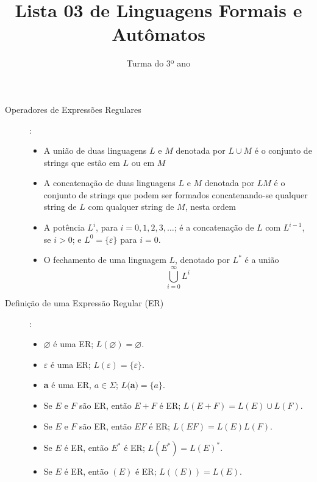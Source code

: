 \documentclass[12pt]{exam}
\title{Lista 03 de Linguagens Formais e Autômatos}
\date{}
\author{Turma do 3º ano}
\def\ve{\varepsilon}
\def\emptyset{\varnothing}
\begin{document}
 

\maketitle

\begin{description}

\item[Operadores de Expressões Regulares]:
\begin{itemize}
\item A união de duas linguagens $L$ e $M$ denotada por $L\cup M$ 
é o conjunto de strings que estão em $L$ ou em $M$
\item A concatenação de duas linguagens $L$ e $M$ denotada por $LM$
é o conjunto de strings que podem ser formados concatenando-se qualquer string de $L$ 
com qualquer string de $M$, 
nesta ordem
\item A potência $L^i$, para $i=0,1,2,3, \dots$; é a concatenação de $L$ com $L^{i-1}$, se $i>0$;
e $L^0 = \{\ve\}$ para $i=0$.
\item O fechamento de uma linguagem $L$, denotado por $L^*$ é a união
\[\bigcup_{i=0}^\infty L^i\]
\end{itemize}

\item[Definição de uma Expressão Regular (ER)]:

\begin{itemize}
\item $\emptyset$ é uma ER; $L(\emptyset) = \emptyset$.
\item $\ve$ é uma ER; $L(\ve) = \{\ve\}$.
\item \textbf{a} é uma ER, $a\in \Sigma$; $L($\textbf{a}$) = \{a\}$.
\item Se $E$ e $F$ são ER, então $E+F$ é ER; $L(E+F) = L(E)\cup L(F)$.
\item Se $E$ e $F$ são ER, então $EF$ é ER; $L(EF) = L(E)L(F)$.
\item Se $E$ é ER, então $E^*$ é ER; $L(E^*) = L(E)^*$.
\item Se $E$ é ER, então $(E)$ é ER; $L((E)) = L(E)$.
\end{itemize}



\end{description}

\vspace{3em}

\break
\end{document}
